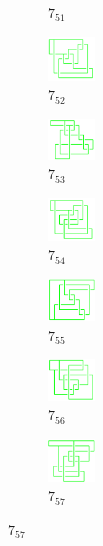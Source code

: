 \documentclass{article}
\theoremstyle{definition}
\theoremstyle{theorem}
\theoremstyle{proposition}
\theoremstyle{corollary}
\begin{document}
\begin{figure}[H]
\begin{subfigure}{0.075\textwidth}
    \caption{$7_{51}$} 
    \end{subfigure}
    \begin{subfigure}{0.075\textwidth}
    \includegraphics[width=1.25cm]{../Midterm_Poster/grid_diagram/theta_7_52.png}
    \caption{$7_{52}$} 
    \end{subfigure}
    \begin{subfigure}{0.075\textwidth}
    \includegraphics[width=1.25cm]{../Midterm_Poster/grid_diagram/theta_7_53.png}
    \caption{$7_{53}$} 
    \end{subfigure}
    \begin{subfigure}{0.075\textwidth}
    \includegraphics[width=1.25cm]{../Midterm_Poster/grid_diagram/theta_7_54.png}
    \caption{$7_{54}$} 
    \end{subfigure}
    \begin{subfigure}{0.075\textwidth}
    \includegraphics[width=1.25cm]{../Midterm_Poster/grid_diagram/theta_7_55.png}
    \caption{$7_{55}$} 
    \end{subfigure}
    \begin{subfigure}{0.075\textwidth}
    \includegraphics[width=1.25cm]{../Midterm_Poster/grid_diagram/theta_7_56.png}
    \caption{$7_{56}$} 
    \end{subfigure}
    \begin{subfigure}{0.075\textwidth}
    \includegraphics[width=1.25cm]{../Midterm_Poster/grid_diagram/theta_7_57.png}
    \caption{$7_{57}$} 
    \end{subfigure}

\end{figure}
\end{document}
